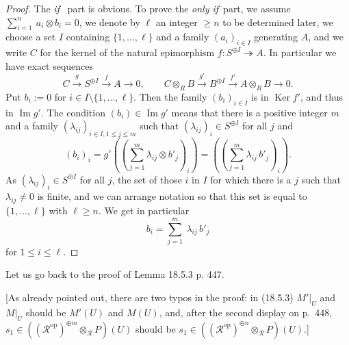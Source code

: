 \documentclass[12pt]{article}
\theoremstyle{remark}
\theoremstyle{definition}
\newcommand{\cc}{\mathcal}
\newcommand{\epi}{\twoheadrightarrow}
\newcommand{\xr}{\xrightarrow}
\DeclareMathOperator{\Ima}{Im}
\DeclareMathOperator{\Ker}{Ker}
\DeclareMathOperator{\op}{op}
\begin{document}
%
\begin{proof}
The {\em if} \ part is obvious. To prove the {\em only if}\ part, we assume $\sum_{i=1}^n\ a_i\otimes b_i=0$, we denote by $\ell$ an integer $\ge n$ to be determined later, we choose a set $I$ containing $\{1,\dots,\ell\}$ and a family $(a_i)_{i\in I}$ generating $A$, and we write $C$ for the kernel of the natural epimorphism $f:S^{\oplus I}\epi A$. In particular we have exact sequences 
$$
C\xr gS^{\oplus I}\xr fA\to0,\qquad C\otimes_RB\xr{g'}B^{\oplus I}\xr{f'}A\otimes_RB\to0.
$$ 
Put $b_i:=0$ for $i\in I\setminus\{1,\dots,\ell\}$. Then the family $(b_i)_{i\in I}$ is in $\Ker f'$, and thus in $\Ima g'$. The condition $(b_i)\in\Ima g'$ means that there is a positive integer $m$ and a family $(\lambda_{ij})_{i\in I,1\le j\le m}$ such that $(\lambda_{ij})_i\in S^{\oplus I}$ for all $j$ and 
$$
(b_i)_i=g'
\left(\left(\sum_{j=1}^m\lambda_{ij}\otimes b'_j\right)_i\right)=
\left(\left(\sum_{j=1}^m\lambda_{ij}\,b'_j\right)_i\right).
$$ 
As $(\lambda_{ij})_i\in S^{\oplus I}$ for all $j$, the set of those $i$ in $I$ for which there is a $j$ such that $\lambda_{ij}\neq0$ is finite, and we can arrange notation so that this set is equal to $\{1,\dots,\ell\}$ with $\ell\ge n$. We get in particular  
$$
b_i=\sum_{j=1}^m\ \lambda_{ij}\,b'_j
$$ 
for $1\le i\le\ell$.
\end{proof}
%
Let us go back to the proof of Lemma 18.5.3 p. 447.

[As already pointed out, there are two typos in the proof: in (18.5.3) $M'|_U$ and $M|_U$ should be $M'(U)$ and $M(U)$, and, after the second display on p.~448, $s_1\in((\cc R^{\op})^{\oplus m}\otimes_{\cc R}P)(U)$ should be $s_1\in((\cc R^{\op})^{\oplus n}\otimes_{\cc R}P)(U)$.]
\end{document}
